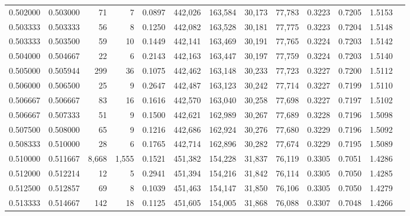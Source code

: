\begin{tabular}{rrrrrrrrrrrrr}
0.502000 & 0.503000 &     71 &     7 &                                     0.0897 & 442,026 & 163,584 &  30,173 &  77,783 & 0.3223 & 0.7205 & 1.5153 \\
0.503333 & 0.503333 &     56 &     8 &                                     0.1250 & 442,082 & 163,528 &  30,181 &  77,775 & 0.3223 & 0.7204 & 1.5148 \\
0.503333 & 0.503500 &     59 &    10 &                                     0.1449 & 442,141 & 163,469 &  30,191 &  77,765 & 0.3224 & 0.7203 & 1.5142 \\
0.504000 & 0.504667 &     22 &     6 &                                     0.2143 & 442,163 & 163,447 &  30,197 &  77,759 & 0.3224 & 0.7203 & 1.5140 \\
0.505000 & 0.505944 &    299 &    36 &                                     0.1075 & 442,462 & 163,148 &  30,233 &  77,723 & 0.3227 & 0.7200 & 1.5112 \\
0.506000 & 0.506500 &     25 &     9 &                                     0.2647 & 442,487 & 163,123 &  30,242 &  77,714 & 0.3227 & 0.7199 & 1.5110 \\
0.506667 & 0.506667 &     83 &    16 &                                     0.1616 & 442,570 & 163,040 &  30,258 &  77,698 & 0.3227 & 0.7197 & 1.5102 \\
0.506667 & 0.507333 &     51 &     9 &                                     0.1500 & 442,621 & 162,989 &  30,267 &  77,689 & 0.3228 & 0.7196 & 1.5098 \\
0.507500 & 0.508000 &     65 &     9 &                                     0.1216 & 442,686 & 162,924 &  30,276 &  77,680 & 0.3229 & 0.7196 & 1.5092 \\
0.508333 & 0.510000 &     28 &     6 &                                     0.1765 & 442,714 & 162,896 &  30,282 &  77,674 & 0.3229 & 0.7195 & 1.5089 \\
0.510000 & 0.511667 &  8,668 & 1,555 &                                     0.1521 & 451,382 & 154,228 &  31,837 &  76,119 & 0.3305 & 0.7051 & 1.4286 \\
0.512000 & 0.512214 &     12 &     5 &                                     0.2941 & 451,394 & 154,216 &  31,842 &  76,114 & 0.3305 & 0.7050 & 1.4285 \\
0.512500 & 0.512857 &     69 &     8 &                                     0.1039 & 451,463 & 154,147 &  31,850 &  76,106 & 0.3305 & 0.7050 & 1.4279 \\
0.513333 & 0.514667 &    142 &    18 &                                     0.1125 & 451,605 & 154,005 &  31,868 &  76,088 & 0.3307 & 0.7048 & 1.4266 \\

\end{tabular}
